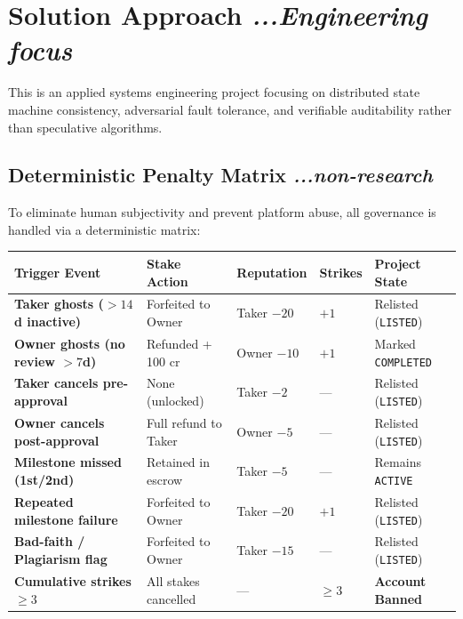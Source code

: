 \documentclass[11pt,a4paper]{article}
\begin{document}
\section{Solution Approach \hfill \normalfont\small\textit{...Engineering focus}}
This is an applied systems engineering project focusing on distributed state machine consistency, adversarial fault tolerance, and verifiable auditability rather than speculative algorithms.

\subsection{Deterministic Penalty Matrix \hfill \normalfont\small\textit{...non-research}}
To eliminate human subjectivity and prevent platform abuse, all governance is handled via a deterministic matrix:
\begin{center}
\small
\setlength{\tabcolsep}{4.5pt}
\renewcommand{\arraystretch}{1.2}
\begin{tabularx}{\textwidth}{>{\raggedright\bfseries}p{4.2cm} >{\raggedright}p{3.8cm} >{\raggedright}p{2.1cm} >{\centering\arraybackslash}p{1.3cm} >{\raggedright\arraybackslash}X}
\toprule
\textnormal{\textbf{Trigger Event}} & \textbf{Stake Action} & \textbf{Reputation} & \textbf{Strikes} & \textbf{Project State} \\
\midrule
Taker ghosts ($>14$d inactive)    & Forfeited to Owner   & Taker $-20$ & $+1$ & Relisted (\texttt{LISTED}) \\
Owner ghosts (no review $>7$d)   & Refunded + 100 cr    & Owner $-10$ & $+1$ & Marked \texttt{COMPLETED} \\
Taker cancels pre-approval        & None (unlocked)      & Taker $-2$  & ---  & Relisted (\texttt{LISTED}) \\
Owner cancels post-approval       & Full refund to Taker & Owner $-5$  & ---  & Relisted (\texttt{LISTED}) \\
Milestone missed (1st/2nd)        & Retained in escrow   & Taker $-5$  & ---  & Remains \texttt{ACTIVE} \\
Repeated milestone failure        & Forfeited to Owner   & Taker $-20$ & $+1$ & Relisted (\texttt{LISTED}) \\
Bad-faith / Plagiarism flag       & Forfeited to Owner   & Taker $-15$ & ---  & Relisted (\texttt{LISTED}) \\
Cumulative strikes $\ge 3$        & All stakes cancelled & ---         & $\ge 3$ & \textbf{Account Banned} \\
\bottomrule
\end{tabularx}
\end{center}
\end{document}

